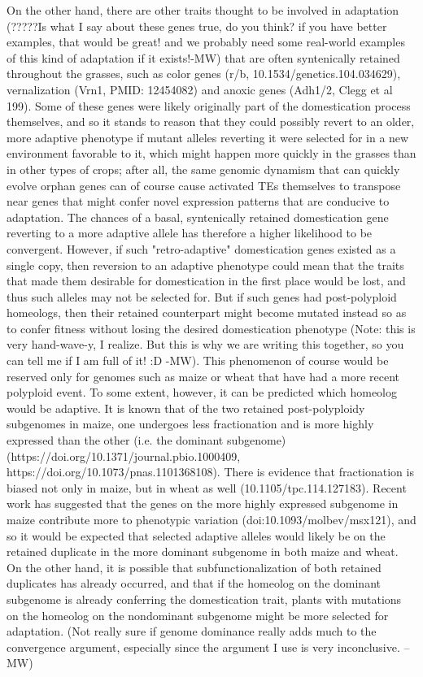 \documentclass[12pt]{article}
\begin{document}
On the other hand, there are other traits thought to be involved in adaptation (?????Is what I say about these genes true, do you think? if you have better examples, that would be great! and we probably need some real-world examples of this kind of adaptation if it exists!-MW) that are often syntenically retained throughout the grasses, such as color genes (r/b, 10.1534/genetics.104.034629), vernalization (Vrn1, PMID: 12454082) and anoxic genes (Adh1/2, Clegg et al 199).
Some of these genes were likely originally part of the domestication process themselves, and so it stands to reason that they could possibly revert to an older, more adaptive phenotype if mutant alleles reverting it were selected for in a new environment favorable to it, which might happen more quickly in the grasses than in other types of crops; after all, the same genomic dynamism that can quickly evolve orphan genes can of course cause activated TEs themselves to transpose near genes that might confer novel expression patterns that are conducive to adaptation.
The chances of a basal, syntenically retained domestication gene reverting to a more adaptive allele has therefore a higher likelihood to be convergent.
However, if such "retro-adaptive" domestication genes existed as a single copy, then reversion to an adaptive phenotype could mean that the traits that made them desirable for domestication in the first place would be lost, and thus such alleles may not be selected for.
But if such genes had post-polyploid homeologs, then their retained counterpart might become mutated instead so as to confer fitness without losing the desired domestication phenotype (Note: this is very hand-wave-y, I realize. But this is why we are writing this together, so you can tell me if I am full of it! :D -MW).
This phenomenon of course would be reserved only for genomes such as maize or wheat that have had a more recent polyploid event.
To some extent, however, it can be predicted which homeolog would be adaptive.
It is known that of the two retained post-polyploidy subgenomes in maize, one undergoes less fractionation and is more highly expressed than the other (i.e. the dominant subgenome) (https://doi.org/10.1371/journal.pbio.1000409, https://doi.org/10.1073/pnas.1101368108).
There is evidence that fractionation is biased not only in maize, but in wheat as well (10.1105/tpc.114.127183).
Recent work has suggested that the genes on the more highly expressed subgenome in maize contribute more to phenotypic variation (doi:10.1093/molbev/msx121), and so it would be expected that selected adaptive alleles would likely be on the retained duplicate in the more dominant subgenome in both maize and wheat.
On the other hand, it is possible that subfunctionalization of both retained duplicates has already occurred, and that if the homeolog on the dominant subgenome is already conferring the domestication trait, plants with mutations on the homeolog on the nondominant subgenome might be more selected for adaptation. (Not really sure if genome dominance really adds much to the convergence argument, especially since the argument I use is very inconclusive. --MW)
\end{document}
